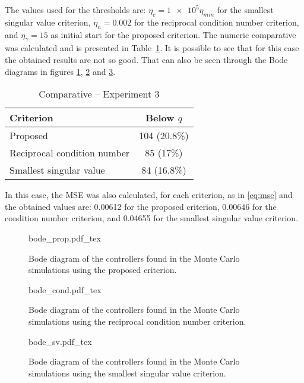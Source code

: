 The values used for the thresholds are: $\eta_c = \num{1e5}\eta_{min} $ for the smallest singular value criterion, $\eta_n = 0.002$ for the reciprocal condition number criterion, and $\eta_\gamma = 15$ as initial start for the proposed criterion.
The numeric comparative was calculated and is presented in Table~\ref{tab:comp_ol_mismatched}.
It is possible to see that for this case the obtained results are not so good.
That can also be seen through the Bode diagrams in figures \ref{fig:bode_prop}, \ref{fig:bode_cond} and \ref{fig:bode_sv}.
\begin{table}[h!]
\caption{Comparative -- Experiment 3 \label{tab:comp_ol_mismatched}}
\centering
\begin{tabular}{lc}
\toprule
Criterion & Below $q$\\
\midrule
Proposed & 104 (20.8\%) \\
Reciprocal condition number & 85 (17\%) \\
Smallest singular value & 84 (16.8\%) \\
\bottomrule
\end{tabular}
\end{table}

In this case, the MSE was also calculated, for each criterion, as in \eqref{eq:mse} and the obtained values are: 0.00612 for the proposed criterion, 0.00646 for the condition number criterion, and 0.04655 for the smallest singular value criterion.


\begin{figure}[h!]
  \centering
  \def\svgwidth{\columnwidth}
  {\footnotesize{bode_prop.pdf_tex}}
  \caption{\label{fig:bode_prop} Bode diagram of the controllers found in the Monte Carlo simulations using the proposed criterion.}
\end{figure}

\begin{figure}[h!]
  \centering
  \def\svgwidth{\columnwidth}
  {\footnotesize{bode_cond.pdf_tex}}
  \caption{\label{fig:bode_cond} Bode diagram of the controllers found in the Monte Carlo simulations using the reciprocal condition number criterion.}
\end{figure}

\begin{figure}[h!]
  \centering
  \def\svgwidth{\columnwidth}
  {\footnotesize{bode_sv.pdf_tex}}
  \caption{\label{fig:bode_sv} Bode diagram of the controllers found in the Monte Carlo simulations using the smallest singular value criterion.}
\end{figure}




